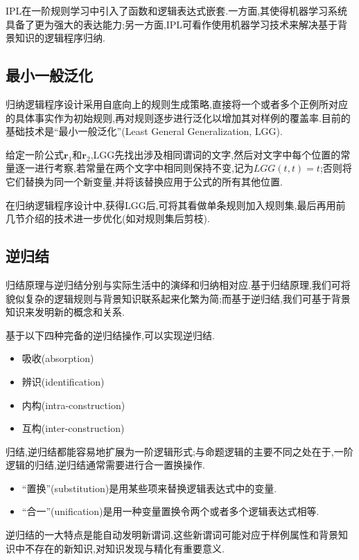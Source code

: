 IPL在一阶规则学习中引入了函数和逻辑表达式嵌套.一方面,其使得机器学习系统具备了更为强大的表达能力;另一方面,IPL可看作使用机器学习技术来解决基于背景知识的逻辑程序归纳.

\subsection{最小一般泛化}

归纳逻辑程序设计采用自底向上的规则生成策略,直接将一个或者多个正例所对应的具体事实作为初始规则,再对规则逐步进行泛化以增加其对样例的覆盖率.目前的基础技术是``最小一般泛化''(Least General Generalization, LGG).

给定一阶公式$\mathbf r_1$和$\mathbf r_2$,LGG先找出涉及相同谓词的文字,然后对文字中每个位置的常量逐一进行考察,若常量在两个文字中相同则保持不变,记为$LGG(t,t)=t$;否则将它们替换为同一个新变量,并将该替换应用于公式的所有其他位置.

在归纳逻辑程序设计中,获得LGG后,可将其看做单条规则加入规则集,最后再用前几节介绍的技术进一步优化(如对规则集后剪枝).

\subsection{逆归结}

归结原理与逆归结分别与实际生活中的演绎和归纳相对应.基于归结原理,我们可将貌似复杂的逻辑规则与背景知识联系起来化繁为简;而基于逆归结,我们可基于背景知识来发明新的概念和关系.

基于以下四种完备的逆归结操作,可以实现逆归结.
\begin{itemize}
\item 吸收(absorption)
\item 辨识(identification)
\item 内构(intra-construction)
\item 互构(inter-construction)
\end{itemize}

归结,逆归结都能容易地扩展为一阶逻辑形式;与命题逻辑的主要不同之处在于,一阶逻辑的归结,逆归结通常需要进行合一置换操作.
\begin{itemize}
\item ``置换''(substitution)是用某些项来替换逻辑表达式中的变量.
\item ``合一''(unification)是用一种变量置换令两个或者多个逻辑表达式相等.
\end{itemize}

逆归结的一大特点是能自动发明新谓词,这些新谓词可能对应于样例属性和背景知识中不存在的新知识,对知识发现与精化有重要意义.
